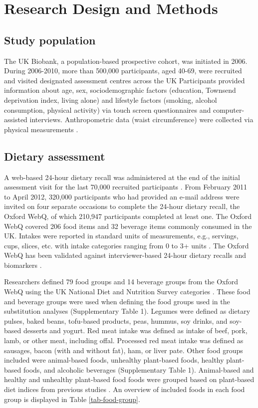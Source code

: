 \documentclass[sn-basic,Numbered,iicol,pdflatex]{sn-jnl}
\begin{document}
\hypertarget{sec2}{%
\section{Research Design and Methods}\label{sec2}}

\hypertarget{subsec1}{%
\subsection{Study population}\label{subsec1}}

The UK Biobank, a population-based prospective cohort, was initiated in
2006. \citep{sudlow2015} During 2006-2010, more than 500,000 participants,
aged 40-69, were recruited and visited designated assessment centres
across the UK Participants provided information about age, sex,
sociodemographic factors (education, Townsend deprivation index, living
alone) and lifestyle factors (smoking, alcohol consumption, physical
activity) via touch screen questionnaires and computer-assisted
interviews. Anthropometric data (waist circumference) were collected via
physical measurements \citep{RN113}.

\hypertarget{subsec2}{%
\subsection{Dietary assessment}\label{subsec2}}

A web-based 24-hour dietary recall was administered at the end of the
initial assessment visit for the last 70,000 recruited participants
\citep{RN115}. From February 2011 to April 2012, 320,000 participants who had
provided an e-mail address were invited on four separate occasions to
complete the 24-hour dietary recall, the Oxford WebQ, of which 210,947
participants completed at least one. The Oxford WebQ covered 206 food
items and 32 beverage items commonly consumed in the UK. Intakes were
reported in standard units of measurements, e.g., servings, cups,
slices, etc. with intake categories ranging from 0 to 3+ units
\citep{piernas2021}. The Oxford WebQ has been validated against
interviewer-based 24-hour dietary recalls and biomarkers \citep{Liu2011, Greenwood2019}.

Researchers defined 79 food groups and 14 beverage groups from the
Oxford WebQ using the UK National Diet and Nutrition Survey categories
\citep{piernas2021}. These food and beverage groups were used when defining
the food groups used in the substitution analyses (Supplementary Table
1). Legumes were defined as dietary pulses, baked beans, tofu-based
products, peas, hummus, soy drinks, and soy-based desserts and yogurt.
Red meat intake was defined as intake of beef, pork, lamb, or other
meat, including offal. Processed red meat intake was defined as
sausages, bacon (with and without fat), ham, or liver pate. Other food
groups included were animal-based foods, unhealthy plant-based foods,
healthy plant-based foods, and alcoholic beverages (Supplementary Table
1). Animal-based and healthy and unhealthy plant-based food foods were
grouped based on plant-based diet indices from previous studies
\citep{Thompson2023, Heianza2021, Satija2017, Satija2016}. An overview of
included foods in each food group is displayed in Table
\ref{tab-food-group}.
\end{document}
